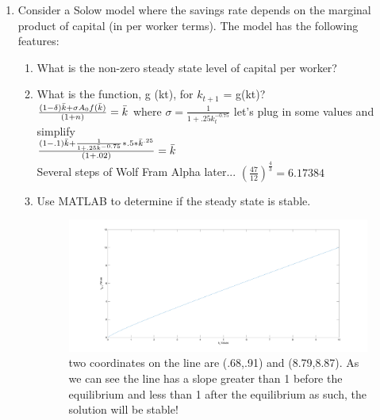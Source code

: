 \documentclass[12pt,oneside,reqno]{amsart}
\begin{document}
\begin{enumerate}
\item Consider a Solow model where the savings rate depends on the marginal product of capital (in per worker terms). The model has the following features:
\begin{enumerate}
    \item What is the non-zero steady state level of capital per worker?
    \item What is the function, g (kt), for $k_{t+1}$ = g(kt)?\\
    $\frac{(1-\delta)\Bar{k}+\sigma A_0 f(\Bar{k})}{(1+n)} = \Bar{k}$ where $\sigma = \frac{1}{1+.25k_t^{-0.75}}$ let's plug in some values and simplify\\
    $\frac{(1-.1)\Bar{k}+\frac{1}{1+.25\Bar{k}^{-0.75}}*.5*\Bar{k}^{.25}}{(1+.02)}=\Bar{k}$\\
    Several steps of Wolf Fram Alpha later... $\left(\frac{47}{12}\right)^{\frac{4}{3}}=6.17384$
    \item Use MATLAB to determine if the steady state is stable.\\
    \begin{figure}[H]
        \centering
        \includegraphics[width =.8\linewidth]{HW1/pics/HW1_Q4.png}
        \caption{two coordinates on the line are (.68,.91) and (8.79,8.87). As we can see the line has a slope greater than 1 before the equilibrium and less than 1 after the equilibrium as such, the solution will be stable!}
    \end{figure}
\end{enumerate}

\end{enumerate}
\end{document}
